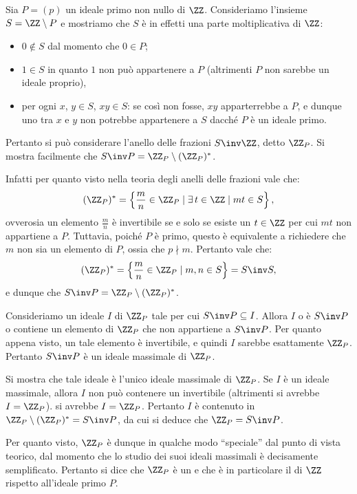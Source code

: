 \documentclass[11pt]{scrartcl}
\begin{document}
	
	Sia $P = (p)$ un ideale primo non nullo di $\ZZ$. Consideriamo l'insieme
	$S = \ZZ \setminus P$ e mostriamo che $S$ è in effetti una parte moltiplicativa
	di $\ZZ$:
	
	\begin{itemize}
		\item $0 \notin S$ dal momento che $0 \in P$;
		\item $1 \in S$ in quanto $1$ non può appartenere a $P$ (altrimenti $P$ non sarebbe un ideale proprio),
		\item per ogni $x$, $y \in S$, $xy \in S$: se così non fosse, $xy$ apparterrebbe
		a $P$, e dunque uno tra $x$ e $y$ non potrebbe appartenere a $S$ dacché
		$P$ è un ideale primo.
	\end{itemize}

	Pertanto si può considerare l'anello delle frazioni $S\inv \ZZ$, detto
	$\ZZ_P$. Si mostra facilmente che $S\inv P = \ZZ_P \setminus (\ZZ_P)^*$. \medskip
	
	
	Infatti per quanto visto nella teoria degli anelli delle frazioni vale che:
	\[ (\ZZ_P)^* = \left\{ \frac{m}{n} \in \ZZ_P \mid \exists \, t \in \ZZ \mid mt \in S \right\}, \]
	ovverosia un elemento $\frac{m}{n}$ è invertibile se e solo se esiste un $t \in \ZZ$
	per cui $mt$ non appartiene a $P$. Tuttavia, poiché $P$ è primo, questo è
	equivalente a richiedere che $m$ non sia un elemento di $P$, ossia che $p \nmid m$.
	Pertanto vale che:
	\[ (\ZZ_P)^* = \left\{ \frac{m}{n} \in \ZZ_P \mid m, n \in S \right\} = S\inv S, \]
	e dunque che $S\inv P = \ZZ_P \setminus (\ZZ_P)^*$.
	
	\begin{remark}
		Consideriamo un ideale $I$ di $\ZZ_P$ tale per cui $S\inv P \subseteq I$.
		Allora $I$ o è $S\inv P$ o contiene un elemento di $\ZZ_P$ che non appartiene
		a $S\inv P$. Per quanto appena visto, un tale elemento è invertibile, e
		quindi $I$ sarebbe esattamente $\ZZ_P$. Pertanto $S\inv P$ è un ideale
		massimale di $\ZZ_P$. \medskip
		
		
		Si mostra che tale ideale è l'unico ideale massimale di $\ZZ_P$. Se $I$
		è un ideale massimale, allora $I$ non può contenere un invertibile (altrimenti si avrebbe $I = \ZZ_P$).
		si avrebbe $I = \ZZ_P$. Pertanto $I$ è contenuto in
		$\ZZ_P \setminus (\ZZ_P)^* = S\inv P$, da cui si deduce che $\ZZ_P = S\inv P$.
	\end{remark}
	
	Per quanto visto, $\ZZ_P$ è dunque in qualche modo ``speciale'' dal punto
	di vista teorico, dal momento che lo studio dei suoi ideali massimali è
	decisamente semplificato. Pertanto si dice che $\ZZ_P$ è un 
	e che è in particolare il  di $\ZZ$ rispetto all'ideale primo
	$P$. \medskip
	
\end{document}
